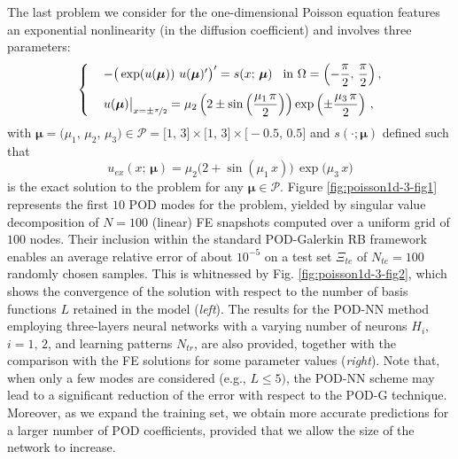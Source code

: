 \documentclass[12pt, a4paper, twoside, openright, notitlepage]{report}
\numberwithin{equation}{chapter}
\theoremstyle{theorem}
\theoremstyle{definition}
\theoremstyle{remark}
\theoremstyle{proposition}
\numberwithin{figure}{chapter}
\newcommand{\bg}[1]{\boldsymbol{#1}}
\begin{document}
		The last problem we consider for the one-dimensional Poisson equation features an exponential nonlinearity (in the diffusion coefficient) and involves three parameters:
		\begin{equation}
			\label{eq:poisson1d-3}
			\begin{cases}
				& - \big( \exp(u(\bg{\mu})) ~ u(\bg{\mu})' \big)' = s(x; \, \bg{\mu}) \hspace*{0.3cm} \text{in $\Omega = \left( -\dfrac{\pi}{2}, \, \dfrac{\pi}{2} \right)$} \, , \\[0.3cm]
				& u(\bg{\mu}) \big|_{x = \pm \nicefrac{\pi}{2}} = \mu_2 \left( 2 \pm \sin\left( \dfrac{\mu_1 \, \pi}{2} \right) \right) \exp \left( \pm \dfrac{\mu_3 \, \pi}{2} \right) \, ,
			\end{cases}
		\end{equation}
		with $\bg{\mu} = \big(\mu_1, \, \mu_2, \, \mu_3 \big) \in \mathcal{P} = \big[ 1, \, 3 \big] \times \big[ 1, \, 3 \big] \times \big[ -0.5, \, 0.5 \big]$ and $s(\cdot; \bg{\mu})$ defined such that \[ u_{ex}(x; \, \bg{\mu}) = \mu_2 \big( 2 + \sin(\mu_1 \, x) \big) \, \exp \big( \mu_3 \, x \big) \] is the exact solution to the problem for any $\bg{\mu} \in \mathcal{P}$. Figure \ref{fig:poisson1d-3-fig1} represents the first $10$ POD modes for the problem, yielded by singular value decomposition of $N = 100$ (linear) FE snapshots computed over a uniform grid of $100$ nodes. Their inclusion within the standard POD-Galerkin RB framework enables an average relative error of about $10^{-5}$ on a test set $\Xi_{te}$ of $N_{te} = 100$ randomly chosen samples. This is whitnessed by Fig. \ref{fig:poisson1d-3-fig2}, which shows the convergence of the solution with respect to the number of basis functions $L$ retained in the model (\emph{left}). The results for the POD-NN method employing three-layers neural networks with a varying number of neurons $H_i$, $i = 1, \, 2$, and learning patterns $N_{tr}$, are also provided, together with the comparison with the FE solutions for some parameter values (\emph{right}). Note that, when only a few modes are considered (e.g., $L \leq 5)$, the POD-NN scheme may lead to a significant reduction of the error with respect to the POD-G technique. Moreover, as we expand the training set, we obtain more accurate predictions for a larger number of POD coefficients, provided that we allow the size of the network to increase.
				
		\vspace*{-0.15cm}
		
\end{document}
